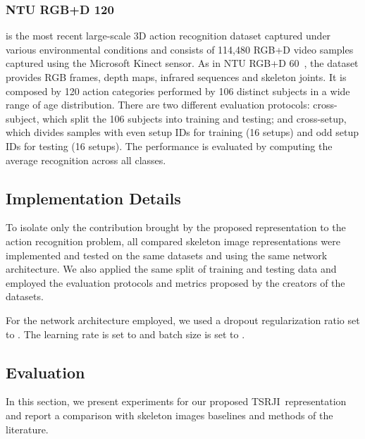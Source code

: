 \documentclass[10pt,conference]{IEEEtran}
\def\sigla{TSRJI}
\begin{document}
\subsubsection{NTU RGB+D 120~\cite{Liu:2019}} is the most recent large-scale 3D action recognition dataset captured under various environmental conditions and consists of 114,480 RGB+D video samples captured using the Microsoft Kinect sensor. As in NTU RGB+D 60~\cite{Shahroudy:2016}, the dataset provides RGB frames, depth maps, infrared sequences and skeleton joints. It is composed by 120 action categories performed by 106 distinct subjects in a wide range of age distribution. There are two different evaluation protocols: cross-subject, which split the 106 subjects into training and testing; and cross-setup, which divides samples with even setup IDs for training (16 setups) and odd setup IDs for testing (16 setups). The performance is evaluated by computing the average recognition across all classes.





\subsection{Implementation Details}

To isolate only the contribution brought by the proposed representation to the action recognition problem, all compared skeleton image representations were implemented and tested on the same datasets and using the same network architecture. We also applied the same split of training and testing data and employed the evaluation protocols and metrics proposed by the creators of the datasets.

For the network architecture employed, we used a dropout regularization ratio set to . The learning rate is set to  and batch size is set to .

\subsection{Evaluation}

In this section, we present experiments for our proposed \sigla~representation and report a comparison with skeleton images baselines and methods of the literature.
\end{document}
